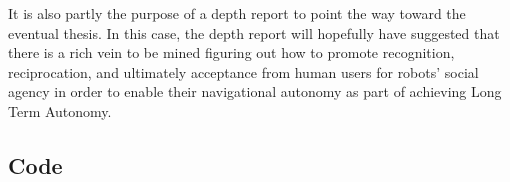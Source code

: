 \documentclass{sfuthesis}
\begin{document}
It is also partly the purpose of a depth report to point the way toward the eventual thesis. In this case, the depth report will hopefully have suggested that there is a rich vein to be mined figuring out how to promote recognition, reciprocation, and ultimately acceptance from human users for robots' social agency in order to enable their navigational autonomy as part of achieving Long Term Autonomy.



%
%
%
%
%

\backmatter%
	
	

\begin{appendices} %
	\chapter{Code}
\end{appendices}
\end{document}
